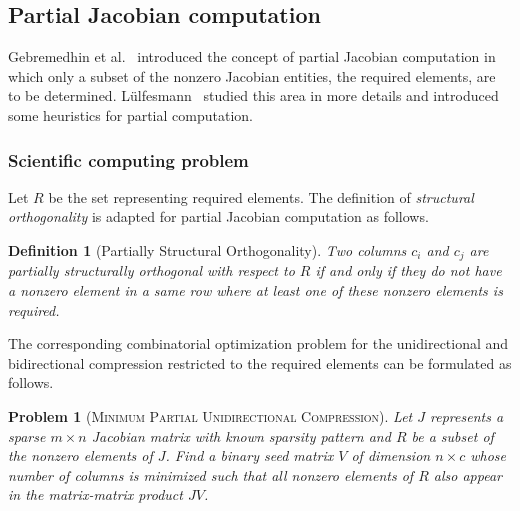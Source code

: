 \documentclass[12pt, twoside,a4paper,toc=bibliography]{scrbook}
\newtheorem{problem}{Problem}
\newtheorem{definition}{Definition}
\newcommand{\col}{\ensuremath{c}}
\newcommand{\MinStaBic}{\textsc{Minimum Star Bicoloring}}
\newcommand{\MinBidCom}{\textsc{Minimum Bidirectional Compression}}
\newcommand{\MinRUniCom}{\textsc{Minimum Partial Unidirectional Compression}}
\begin{document}
\subsection{Partial Jacobian computation}
\label{s.part.jac}
Gebremedhin et al.~\cite{Gebremedhin05whatcolor} introduced the concept of partial Jacobian computation
in which only a subset of the nonzero Jacobian entities, the required elements, are to be determined.
L{\"u}lfesmann~\cite{Lulfesmann2012Fap} studied this area in more details and
introduced some heuristics for partial computation.
\subsubsection{Scientific computing problem}
\label{ss.problem.part}
Let $R$ be the set representing required elements.
The definition of
\emph{structural orthogonality} is adapted for partial Jacobian computation as follows.
\begin{definition}[Partially Structural Orthogonality]\label{d.part.str.orth}
Two columns $c_i$ and $c_j$ are partially structurally orthogonal with respect to $R$
if and only if they do not have a nonzero element in a same row where at least
one of these nonzero elements is required.
\end{definition}

The corresponding combinatorial optimization problem for the unidirectional and bidirectional
compression restricted to the required elements
can be formulated as follows.
\begin{problem}[\MinRUniCom]
\label{p.seed.runi} Let $J$ represents a sparse ${m\times n}$ Jacobian matrix with known sparsity
pattern and $R$ be a subset of the nonzero elements of $J$.
Find a binary seed matrix $V$ of dimension $n\times \col$
whose number of columns is minimized such that all nonzero elements of $R$ also appear in
the matrix-matrix product $JV$.
\end{problem}
\end{document}
